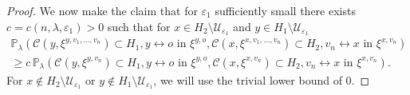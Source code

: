 \documentclass[10pt,a4paper,dvipsnames]{article}
\theoremstyle{definition}
\theoremstyle{remark}
\newcommand{\pla}{\mathbb P_\lambda}
\newcommand{\Ucal}{\mathcal{U}}
\newcommand{\C}{\mathscr {C}}
\newcommand{\conn}[3]{#1 \longleftrightarrow #2\textrm { in } #3}
\newcommand{\orig}{o}
\numberwithin{equation}{section}
\begin{document}
\begin{proof}
    We now make the claim that for $\varepsilon_1$ sufficiently small there exists $c=c(n,\lambda,\varepsilon_1)>0$ such that for $x\in H_2\setminus \Ucal_{\varepsilon_1}$ and $y\in H_1\setminus \Ucal_{\varepsilon_1}$
    \begin{multline}
    \label{eqn:middleClaim}
        \pla\left(\C\left(y,\xi^{y,v_1,\ldots,v_n}\right)\subset  H_1, \conn{y}{\orig}{\xi^{y,\orig}}, \C\left(x,\xi^{x,v_1,\ldots,v_n}\right)\subset  H_2,\conn{v_n}{x}{\xi^{x,v_n}}\right) \\\geq c\, \pla\left(\C\left(y,\xi^{y,v_n}\right)\subset  H_1, \conn{y}{\orig}{\xi^{y,\orig}}, \C\left(x,\xi^{x,v_n}\right)\subset  H_2,\conn{v_n}{x}{\xi^{x,v_n}}\right).
    \end{multline}
    For $x\notin H_2\setminus \Ucal_{\varepsilon_1}$ or $y\notin H_1\setminus \Ucal_{\varepsilon_1}$, we will use the trivial lower bound of $0$.


\end{proof}
\end{document}
